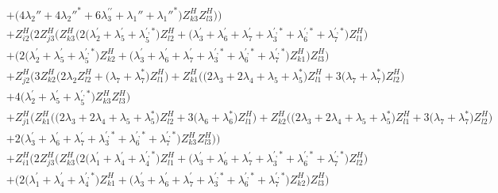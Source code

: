 \begin{align}
 &+\Big(4 \lambda_2''  + 4 \lambda_2''^*  + 6 \lambda^{\prime\prime}_3  + \lambda_1'' + \lambda_1''^*\Big)Z_{{k 3}}^{H} Z_{{l 3}}^{H} \Big)\Big)\nonumber \\ 
 &+Z_{{i 2}}^{H} \Big(2 Z_{{j 3}}^{H} \Big(Z_{{k 3}}^{H} \Big(2 \Big(\lambda^{\prime}_2 + \lambda^{\prime}_5 + \lambda^{{\prime},*}_5\Big)Z_{{l 2}}^{H}  + \Big(\lambda^{\prime}_3 + \lambda^{\prime}_6 + \lambda^{\prime}_7 + \lambda^{{\prime},*}_3 + \lambda^{{\prime},*}_6 + \lambda^{{\prime},*}_7\Big)Z_{{l 1}}^{H} \Big)\nonumber \\ 
 &+\Big(2 \Big(\lambda^{\prime}_2 + \lambda^{\prime}_5 + \lambda^{{\prime},*}_5\Big)Z_{{k 2}}^{H}  + \Big(\lambda^{\prime}_3 + \lambda^{\prime}_6 + \lambda^{\prime}_7 + \lambda^{{\prime},*}_3 + \lambda^{{\prime},*}_6 + \lambda^{{\prime},*}_7\Big)Z_{{k 1}}^{H} \Big)Z_{{l 3}}^{H} \Big)\nonumber \\ 
 &+Z_{{j 2}}^{H} \Big(3 Z_{{k 2}}^{H} \Big(2 \lambda_2 Z_{{l 2}}^{H}  + \Big(\lambda_7 + \lambda_7^*\Big)Z_{{l 1}}^{H} \Big)+Z_{{k 1}}^{H} \Big(\Big(2 \lambda_3  + 2 \lambda_4  + \lambda_5 + \lambda_5^*\Big)Z_{{l 1}}^{H}  + 3 \Big(\lambda_7 + \lambda_7^*\Big)Z_{{l 2}}^{H} \Big)\nonumber \\ 
 &+4 \Big(\lambda^{\prime}_2 + \lambda^{\prime}_5 + \lambda^{{\prime},*}_5\Big)Z_{{k 3}}^{H} Z_{{l 3}}^{H} \Big)\nonumber \\ 
 &+Z_{{j 1}}^{H} \Big(Z_{{k 1}}^{H} \Big(\Big(2 \lambda_3  + 2 \lambda_4  + \lambda_5 + \lambda_5^*\Big)Z_{{l 2}}^{H}  + 3 \Big(\lambda_6 + \lambda_6^*\Big)Z_{{l 1}}^{H} \Big)+Z_{{k 2}}^{H} \Big(\Big(2 \lambda_3  + 2 \lambda_4  + \lambda_5 + \lambda_5^*\Big)Z_{{l 1}}^{H}  + 3 \Big(\lambda_7 + \lambda_7^*\Big)Z_{{l 2}}^{H} \Big)\nonumber \\ 
 &+2 \Big(\lambda^{\prime}_3 + \lambda^{\prime}_6 + \lambda^{\prime}_7 + \lambda^{{\prime},*}_3 + \lambda^{{\prime},*}_6 + \lambda^{{\prime},*}_7\Big)Z_{{k 3}}^{H} Z_{{l 3}}^{H} \Big)\Big)\nonumber \\ 
 &+Z_{{i 1}}^{H} \Big(2 Z_{{j 3}}^{H} \Big(Z_{{k 3}}^{H} \Big(2 \Big(\lambda^{\prime}_1 + \lambda^{\prime}_4 + \lambda^{{\prime},*}_4\Big)Z_{{l 1}}^{H}  + \Big(\lambda^{\prime}_3 + \lambda^{\prime}_6 + \lambda^{\prime}_7 + \lambda^{{\prime},*}_3 + \lambda^{{\prime},*}_6 + \lambda^{{\prime},*}_7\Big)Z_{{l 2}}^{H} \Big)\nonumber \\ 
 &+\Big(2 \Big(\lambda^{\prime}_1 + \lambda^{\prime}_4 + \lambda^{{\prime},*}_4\Big)Z_{{k 1}}^{H}  + \Big(\lambda^{\prime}_3 + \lambda^{\prime}_6 + \lambda^{\prime}_7 + \lambda^{{\prime},*}_3 + \lambda^{{\prime},*}_6 + \lambda^{{\prime},*}_7\Big)Z_{{k 2}}^{H} \Big)Z_{{l 3}}^{H} \Big)\nonumber \\ 

\end{align}
